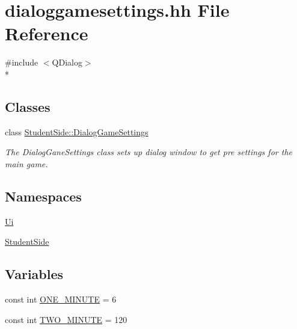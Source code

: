 \hypertarget{dialoggamesettings_8hh}{\section{dialoggamesettings.\-hh File Reference}
\label{dialoggamesettings_8hh}
}
{\ttfamily \#include $<$Q\-Dialog$>$}\\*
\subsection*{Classes}
\begin{DoxyCompactItemize}
\item 
class \hyperlink{class_student_side_1_1_dialog_game_settings}{Student\-Side\-::\-Dialog\-Game\-Settings}
\begin{DoxyCompactList}\small\item\em The Dialog\-Gane\-Settings class sets up dialog window to get pre settings for the main game. \end{DoxyCompactList}\end{DoxyCompactItemize}
\subsection*{Namespaces}
\begin{DoxyCompactItemize}
\item 
\hyperlink{namespace_ui}{Ui}
\item 
\hyperlink{namespace_student_side}{Student\-Side}
\end{DoxyCompactItemize}
\subsection*{Variables}
\begin{DoxyCompactItemize}
\item 
const int \hyperlink{dialoggamesettings_8hh_a8b40e2e7fdfe4c765aa9aaa6fec9b431}{O\-N\-E\-\_\-\-M\-I\-N\-U\-T\-E} = 6
\item 
const int \hyperlink{dialoggamesettings_8hh_aedc05529ef6072630839aed27d71b5ae}{T\-W\-O\-\_\-\-M\-I\-N\-U\-T\-E} = 120
\end{DoxyCompactItemize}


